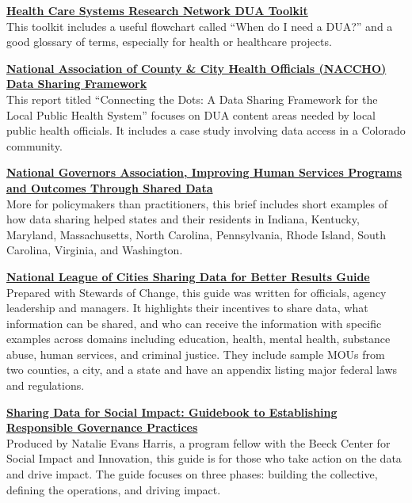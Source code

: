 \documentclass[
]{WileySix}
\begin{document}
\textbf{\href{http://www.hcsrn.org/asset/ce41ec1a-c071-4300-ac07-14cd653f234C/HCSRN_DUAToolkit.pdf}{Health Care Systems Research Network DUA Toolkit}}\\
This toolkit includes a useful flowchart called ``When do I need a DUA?'' and a good glossary of terms, especially for health or healthcare projects.

\textbf{\href{https://www.naccho.org/uploads/downloadable-resources/Issue-Brief-Data-Sharing-Framework-NA592.pdf}{National Association of County \& City Health Officials (NACCHO) Data Sharing Framework}}\\
This report titled ``Connecting the Dots: A Data Sharing Framework for the Local Public Health System'' focuses on DUA content areas needed by local public health officials. It includes a case study involving data access in a Colorado community.

\textbf{\href{http://natlgovassoc.wpengine.com/wp-content/uploads/2018/07/1609ImprovingHumanServicesSharedData.pdf}{National Governors Association, Improving Human Services Programs and Outcomes Through Shared Data}}\\
More for policymakers than practitioners, this brief includes short examples of how data sharing helped states and their residents in Indiana, Kentucky, Maryland, Massachusetts, North Carolina, Pennsylvania, Rhode Island, South Carolina, Virginia, and Washington.

\textbf{\href{https://www.nlc.org/sharing-data-for-better-results}{National League of Cities Sharing Data for Better Results Guide}}\\
Prepared with Stewards of Change, this guide was written for officials, agency leadership and managers. It highlights their incentives to share data, what information can be shared, and who can receive the information with specific examples across domains including education, health, mental health, substance abuse, human services, and criminal justice. They include sample MOUs from two counties, a city, and a state and have an appendix listing major federal laws and regulations.

\textbf{\href{https://beeckcenter.georgetown.edu/wp-content/uploads/2020/01/Data-Sharing-Report.pdf}{Sharing Data for Social Impact: Guidebook to Establishing Responsible Governance Practices}}\\
Produced by Natalie Evans Harris, a program fellow with the Beeck Center for Social Impact and Innovation, this guide is for those who take action on the data and drive impact. The guide focuses on three phases: building the collective, defining the operations, and driving impact.
\end{document}
